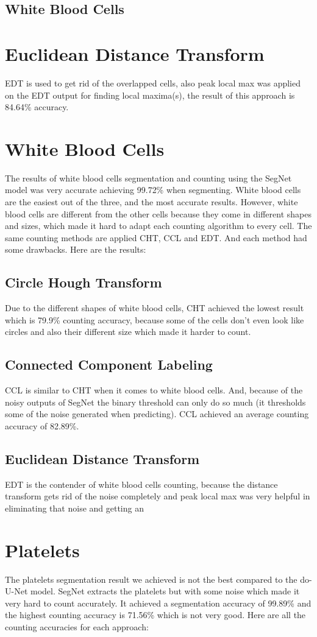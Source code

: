 \documentclass[conference]{IEEEtran}
\begin{document}
\subsection{White Blood Cells}

\section{Euclidean Distance Transform}
EDT is used to get rid of the overlapped cells, also peak local max was applied on the EDT output for finding local maxima(s), the result of this approach is 84.64\% accuracy.
\section{White Blood Cells}
The results of white blood cells segmentation and counting using the SegNet model was very accurate achieving 99.72\% when segmenting. White blood cells are the easiest out of the three, and the most accurate results. However, white blood cells are different from the other cells because they come in different shapes and sizes, which made it hard to adapt each counting algorithm to every cell. The same counting methods are applied CHT, CCL and EDT. And each method had some drawbacks. Here are the results:
\subsection{Circle Hough Transform}
Due to the different shapes of white blood cells, CHT achieved the lowest result which is 79.9\% counting accuracy, because some of the cells don’t even look like circles and also their different size which made it harder to count.
\subsection{Connected Component Labeling}
CCL is similar to CHT when it comes to white blood cells. And, because of the noisy outputs of SegNet the binary threshold can only do so much (it thresholds some of the noise generated when predicting). CCL achieved an average counting accuracy of 82.89\%.
\subsection{Euclidean Distance Transform}
EDT is the contender of white blood cells counting, because the distance transform gets rid of the noise completely and peak local max was very helpful in eliminating that noise and getting an 
\section{Platelets}
The platelets segmentation result we achieved is not the best compared to the do-U-Net model. SegNet extracts the platelets but with some noise which made it very hard to count accurately. It achieved a segmentation accuracy of 99.89\% and the highest counting accuracy is 71.56\% which is not very good. Here are all the counting accuracies for each approach:
\end{document}
